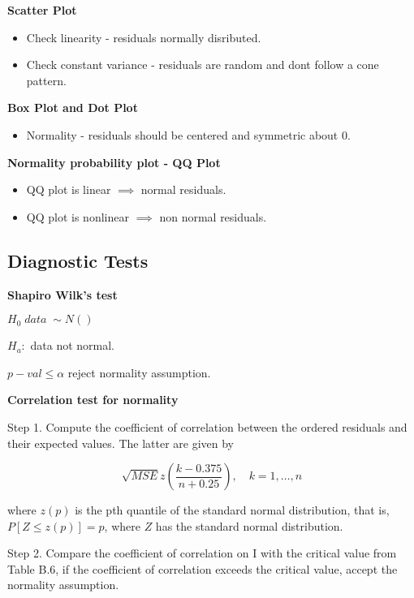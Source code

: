 \documentclass[10pt]{article}
\newcommand{\hlEmph}[1]{\colorbox{DarkSeaGreen2}{#1}}
\begin{document}
\begin{multicols}{3}
    \textbf{Scatter Plot}
    \begin{itemize}
        \item Check \hlEmph{linearity} - residuals normally disributed.
        \item Check \hlEmph{constant variance} - residuals are random and dont follow a cone pattern.
    \end{itemize}

    \textbf{Box Plot and Dot Plot}
    \begin{itemize}
        \item Normality - residuals should be centered and symmetric about 0.
    \end{itemize}

    \textbf{Normality probability plot - QQ Plot}
    \begin{itemize}
        \item QQ plot is linear $\implies$ normal residuals.
        \item QQ plot is nonlinear $\implies$ non normal residuals.
    \end{itemize}

    \subsection{Diagnostic Tests}

    \textbf{Shapiro Wilk's test}

    $H_0 \; data \; \sim N()$

    $H_a:$ data not normal.

    $p-val \leq \alpha$ reject normality assumption.

    \textbf{Correlation test for normality}

    Step 1. Compute the coefficient of correlation between the ordered residuals and their expected values. The latter are given by

    \begin{equation}
        \sqrt{MSE} z(\frac{k - 0.375}{n + 0.25}), \quad k = 1,\dots,n
    \end{equation}

    where $z(p)$ is the pth quantile of the standard normal distribution, that is, $P[Z \leq z(p)] = p$,
    where $Z$ has the standard normal distribution.

    Step 2. Compare the coefficient of correlation on I with the critical value from Table B.6, if the
    coefficient of correlation exceeds the critical value, accept the normality assumption.


\end{multicols}
\end{document}
